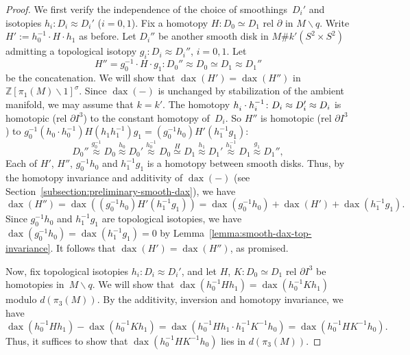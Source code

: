 \documentclass[11pt]{amsart}
\theoremstyle{definition}
\theoremstyle{theorem-giventitle}
\theoremstyle{definition-giventitle}
\numberwithin{equation}{section}
\def\Z{\mathbb{Z}}
\def\dax{\operatorname{dax}}
\def\setminus{\smallsetminus}
\begin{document}
\begin{proof}
  We first verify the independence of the choice of smoothings~$D_i'$ and isotopies $h_i\colon D_i \approx D_i'$ ($i=0,1$).
  Fix a homotopy $H\colon D_0 \simeq D_1$ rel $\partial$ in $M\setminus q$.
  Write $H':=h_0^{-1}\cdot H\cdot h_1$ as before.
  Let $D_i''$ be another smooth disk in $M\# k' (S^2\times S^2)$ admitting a topological isotopy $g_i\colon D_i \approx D_i''$, $i=0,1$.
  Let
  \[
    H'' = g_0^{-1}\cdot H \cdot g_1 \colon D_0''\approx D_0 \simeq D_1 \approx D_1''
  \]
  be the concatenation.
  We will show that $\dax(H')=\dax(H'')$ in $\Z[\pi_1(M)\setminus 1]^\sigma$.
  Since $\dax(-)$ is unchanged by stabilization of the ambient manifold, we may assume that $k=k'$.
  The homotopy $h_i^{\vphantom{1}} \cdot h_i^{-1} \colon D_i \approx D_i' \approx D_i$ is homotopic (rel $\partial I^3$) to the constant homotopy of~$D_i$.
  So $H''$ is homotopic (rel $\partial I^3$) to $g_0^{-1} (h_0 \cdot h_0^{-1}) H (h_1 h_1^{-1}) g_1 = (g_0^{-1} h_0) H' (h_1^{-1} g_1)\colon$
  \[
    D_0'' \stackrel{g_0^{-1}}{\approx} D_0 \stackrel{h_0}{\approx} D_0' \stackrel{h_0^{-1}}{\approx} D_0 \stackrel{H}{\simeq} D_1 \stackrel{h_1}{\approx} D_1' \stackrel{h_1^{-1}}{\approx} D_1 \stackrel{g_1}{\approx} D_1'',
  \]
  Each of $H'$, $H''$, $g_0^{-1}h_0$ and $h_1^{-1}g_1$ is a homotopy between smooth disks.
  Thus, by the homotopy invariance and additivity of $\dax(-)$ (see Section~\ref{subsection:preliminary-smooth-dax}), we have
  \[
    \dax(H'') = \dax( (g_0^{-1} h_0) H' (h_1^{-1} g_1) ) = \dax(g_0^{-1} h_0) + \dax(H') + \dax(h_1^{-1} g_1).
  \]
  Since $g_0^{-1}h_0$ and $h_1^{-1}g_1$ are topological isotopies, we have $\dax(g_0^{-1}h_0) = \dax(h_1^{-1}g_1) = 0$ by Lemma~\ref{lemma:smooth-dax-top-invariance}.
  It follows that $\dax(H') = \dax(H'')$, as promised.

  Now, fix topological isotopies $h_i\colon D_i \approx D_i'$, and let $H$, $K \colon D_0 \simeq D_1$ rel $\partial I^3$ be homotopies in~$M\setminus q$.
  We will show that $\dax(h_0^{-1}H h_1) = \dax(h_0^{-1}K h_1)$ modulo $d(\pi_3(M))$.
  By the additivity, inversion and homotopy invariance, we have
  \[
    \dax(h_0^{-1}H h_1) - \dax(h_0^{-1}K h_1) = \dax(h_0^{-1}H h_1 \cdot h_1^{-1}K^{-1} h_0) = \dax(h_0^{-1}HK^{-1}h_0).
  \]
  Thus, it suffices to show that $\dax(h_0^{-1}HK^{-1}h_0)$ lies in $d(\pi_3(M))$.
  

\end{proof}
\end{document}
